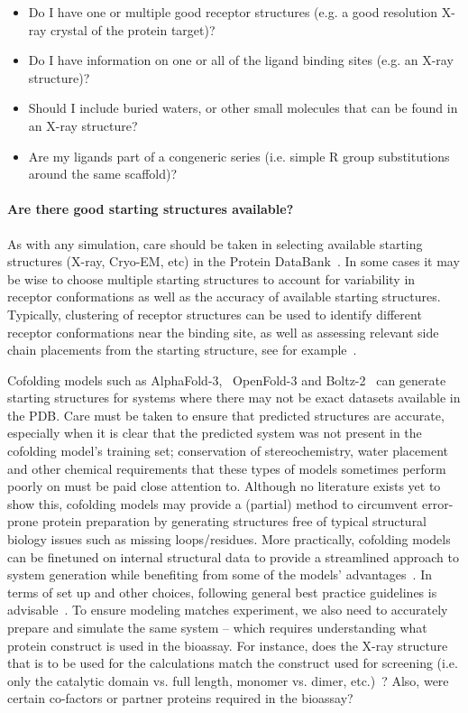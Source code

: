 \documentclass[9pt,bestpractices]{livecoms}
\begin{document}
\begin{itemize}
    \item Do I have one or multiple good receptor structures (e.g. a good resolution X-ray crystal of the protein target)?
    \item Do I have information on one or all of the ligand binding sites (e.g. an X-ray structure)?
    \item Should I include buried waters, or other small molecules that can be found in an X-ray structure?
    \item Are my ligands part of a congeneric series (i.e. simple R group substitutions around the same scaffold)?
    \end{itemize}

\paragraph{Are there good starting structures available?}
As with any simulation, care should be taken in selecting available starting structures (X-ray, Cryo-EM, etc) in the Protein DataBank~\cite{berman2003announcing}. In some cases it may be wise to choose multiple starting structures to account for variability in receptor conformations as well as the accuracy of available starting structures. Typically, clustering of receptor structures can be used to identify different receptor conformations near the binding site, as well as assessing relevant side chain placements from the starting structure, see for example~\cite{mey2016blinded}. 

Cofolding models such as AlphaFold-3,~\cite{abramson_2024} OpenFold-3 and Boltz-2~\cite{passaro_2025} can generate starting structures for systems where there may not be exact datasets available in the PDB. Care must be taken to ensure that predicted structures are accurate, especially when it is clear that the predicted system was not present in the cofolding model's training set; conservation of stereochemistry, water placement and other chemical requirements that these types of models sometimes perform poorly on must be paid close attention to. Although no literature exists yet to show this, cofolding models may provide a (partial) method to circumvent error-prone protein preparation by generating structures free of typical structural biology issues such as missing loops/residues. More practically, cofolding models can be finetuned on internal structural data to provide a streamlined approach to system generation while benefiting from some of the models' advantages~\cite{scheen_2025,thaler2026boltz, beuming_2022, coskun_2023}. In terms of set up and other choices, following general best practice guidelines is advisable~\cite{braun2019best}. To ensure modeling matches experiment, we also need to accurately prepare and simulate the same system -- which requires understanding what protein construct is used in the bioassay. For instance, does the X-ray structure that is to be used for the calculations match the construct used for screening (i.e. only the catalytic domain vs. full length, monomer vs. dimer, etc.)~\cite{perez-benito2018predicting}? Also, were certain co-factors or partner proteins required in the bioassay? 
\end{document}
